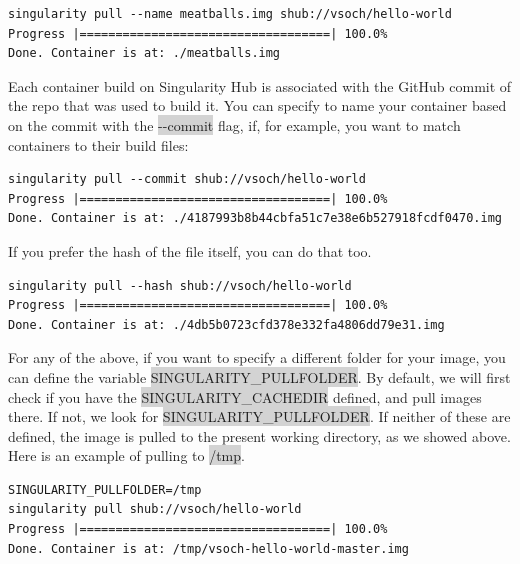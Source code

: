 \documentclass[a4paper]{article}
\newcounter{subsubsubsection}[subsubsection]
\begin{document}
\begin{lstlisting}[frame=single]
singularity pull --name meatballs.img shub://vsoch/hello-world
Progress |===================================| 100.0% 
Done. Container is at: ./meatballs.img

\end{lstlisting}
		
		Each container build on Singularity Hub is associated with the GitHub commit of the repo that was used to build it. You can specify to name your container based on the commit with the \colorbox{lightgray}{-{}-commit} flag, if, for example, you want to match containers to their build files:
		
\begin{lstlisting}[frame=single]
singularity pull --commit shub://vsoch/hello-world
Progress |===================================| 100.0% 
Done. Container is at: ./4187993b8b44cbfa51c7e38e6b527918fcdf0470.img
\end{lstlisting}
		
		
		If you prefer the hash of the file itself, you can do that too.
		
\begin{lstlisting}[frame=single]
singularity pull --hash shub://vsoch/hello-world
Progress |===================================| 100.0% 
Done. Container is at: ./4db5b0723cfd378e332fa4806dd79e31.img
\end{lstlisting}

		For any of the above, if you want to specify a different folder for your image, you can define the variable \colorbox{lightgray}{SINGULARITY\_PULLFOLDER}. By default, we will first check if you have the \colorbox{lightgray}{SINGULARITY\_CACHEDIR} defined, and pull images there. If not, we look for \colorbox{lightgray}{SINGULARITY\_PULLFOLDER}. If neither of these are defined, the image is pulled to the present working directory, as we showed above. Here is an example of pulling to \colorbox{lightgray}{/tmp}.\\[0.1in]

\begin{lstlisting}[frame=single]
SINGULARITY_PULLFOLDER=/tmp
singularity pull shub://vsoch/hello-world
Progress |===================================| 100.0% 
Done. Container is at: /tmp/vsoch-hello-world-master.img
\end{lstlisting}
\end{document}
